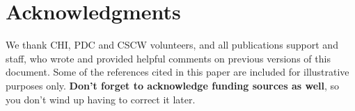 \documentclass{sigchi}
\begin{document}
\section{Acknowledgments}

We thank CHI, PDC and CSCW volunteers, and all publications support
and staff, who wrote and provided helpful comments on previous
versions of this document.  Some of the references cited in this paper
are included for illustrative purposes only.  \textbf{Don't forget
to acknowledge funding sources as well}, so you don't wind up
having to correct it later.

%
%
%
%
%
\balance



\end{document}
